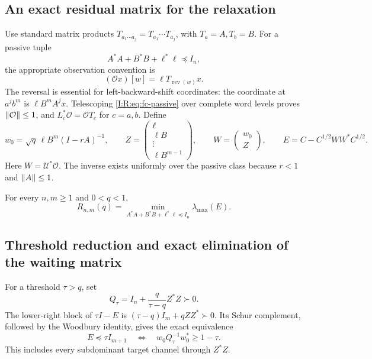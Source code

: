 \subsection{An exact residual matrix for the relaxation}

Use standard matrix products $T_{a_1\cdots a_j}=T_{a_1}\cdots T_{a_j}$, with
$T_a=A,T_b=B$. For a passive tuple
\begin{equation}
 A^*A+B^*B+\ell^*\ell\preceq I_n,
 \label{I:R:eq:fc-passive}
\end{equation}
the appropriate observation convention is
\[
 (\mathcal Ox)[w]=\ell T_{\operatorname{rev}(w)}x.
\]
The reversal is essential for left-backward-shift coordinates: the coordinate
at $a^j b^m$ is $\ell B^m A^j x$. Telescoping
\eqref{I:R:eq:fc-passive} over complete word levels proves
$\left\lVert\mathcal O\right\rVert\le1$, and
$L_c^*\mathcal O=\mathcal OT_c$ for $c=a,b$.
Define
\begin{equation}
 w_0=\sqrt q\,\ell B^m(I-rA)^{-1},\qquad
 Z=\begin{pmatrix}\ell\\\ell B\\\vdots\\\ell B^{m-1}\end{pmatrix},
 \qquad W=\begin{pmatrix}w_0\\Z\end{pmatrix},\qquad
 E=C-C^{1/2}WW^*C^{1/2}.
 \label{I:R:eq:fc-E}
\end{equation}
Here $W=\mathcal U^*\mathcal O$. The inverse exists uniformly over the passive
class because $r<1$ and $\left\lVert A\right\rVert\le1$.

\begin{theorem}
\label{I:R:thm:fc-residual}
For every $n,m\ge1$ and $0<q<1$,
\begin{equation}
 R_{n,m}(q)=\min_{A^*A+B^*B+\ell^*\ell\preceq I_n}
                  \lambda_{\max}(E).
 \label{I:R:eq:fc-passive-min}
\end{equation}
\end{theorem}


\subsection{Threshold reduction and exact elimination of the waiting matrix}

For a threshold $\tau>q$, set
\begin{equation}
 Q_\tau=I_n+\frac{q}{\tau-q}Z^*Z\succ0.
 \label{I:R:eq:fc-Q}
\end{equation}
The lower-right block of $\tau I-E$ is
$(\tau-q)I_m+qZZ^*\succ0$. Its Schur complement, followed by the Woodbury
identity, gives the exact equivalence
\begin{equation}
 E\preceq\tau I_{m+1}
 \quad\Longleftrightarrow\quad
 w_0Q_\tau^{-1}w_0^*\ge1-\tau.
 \label{I:R:eq:fc-threshold}
\end{equation}
This includes every subdominant target channel through $Z^*Z$.

